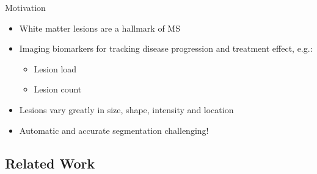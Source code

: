 \documentclass{beamer}
\begin{document}
\begin{frame}{Motivation}
\begin{itemize}
\item White matter lesions are a hallmark of MS
\item Imaging biomarkers for tracking disease progression and treatment effect,
e.g.:
\begin{itemize}
\item Lesion load
\item Lesion count
\end{itemize}
\item<2-> Lesions vary greatly in size, shape, intensity and location
\item<2->[$\Rightarrow$] \alert{Automatic and accurate segmentation
challenging!}
\end{itemize}
\end{frame}

\subsection{Related Work}
\end{document}
